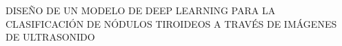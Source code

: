 \begin{center}
	\vspace*{10cm}
	{DISEÑO DE UN MODELO DE DEEP LEARNING PARA LA CLASIFICACIÓN DE NÓDULOS TIROIDEOS A TRAVÉS DE IMÁGENES DE ULTRASONIDO}
\end{center}
